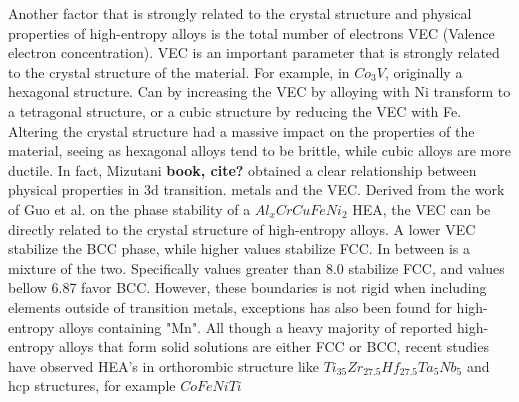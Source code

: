 Another factor that is strongly related to the crystal structure and physical properties of high-entropy alloys is the total number of electrons VEC (Valence electron concentration). VEC is an important parameter that is strongly related to the crystal structure of the material. For example, in $Co_3V$, originally a hexagonal structure. Can by increasing the VEC by alloying with Ni transform to a tetragonal structure, or a cubic structure by reducing the VEC with Fe. Altering the crystal structure had a massive impact on the properties of the material, seeing as hexagonal alloys tend to be brittle, while cubic alloys are more ductile. In fact, Mizutani \textbf{book, cite?} obtained a clear relationship between physical properties in 3d transition.  metals and the VEC. Derived from the work of Guo et al. on the phase stability of a $Al_xCrCuFeNi_2$ HEA, the VEC can be directly related to the crystal structure of high-entropy alloys. A lower VEC stabilize the BCC phase, while higher values stabilize FCC. In between is a mixture of the two. Specifically values greater than 8.0 stabilize FCC, and values bellow 6.87 favor BCC. However, these boundaries is not rigid when including elements outside of transition metals, exceptions has also been found for high-entropy alloys containing "Mn". All though a heavy majority of reported high-entropy alloys that form solid solutions are either FCC or BCC, recent studies have observed HEA's in orthorombic structure like $Ti_{35}Zr_{27.5}Hf_{27.5}Ta_5Nb_5$ and hcp structures, for example $CoFeNiTi$

